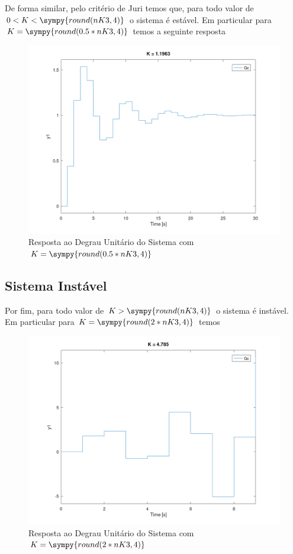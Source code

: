 \documentclass[a4paper,11pt]{article}
\newcommand{\npy}[1]{\sympy{round(#1,4)}}
\begin{document}
De forma similar, pelo critério de Juri temos que, para todo valor de $0< K < \npy{nK3}$ o sistema é estável. Em particular para $K = \npy{0.5*nK3}$ temos a seguinte resposta

\begin{figure}[H]
    \centering
    \includegraphics[width=0.9\linewidth]{img/exsim1-plot-stable.png}
    \caption{Resposta ao Degrau Unitário do Sistema com $K = \npy{0.5*nK3}$}
\end{figure}

\subsection{Sistema Instável}

Por fim, para todo valor de $K > \npy{nK3}$ o sistema é instável. Em particular para $K = \npy{2*nK3}$ temos

\begin{figure}[H]
    \centering
    \includegraphics[width=0.9\linewidth]{img/exsim1-plot-instable.png}
    \caption{Resposta ao Degrau Unitário do Sistema com $K = \npy{2*nK3}$}
\end{figure}
\end{document}
